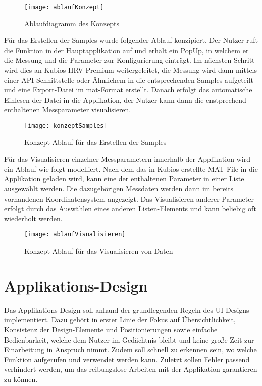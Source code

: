 \begin{figure}[H]
	\centering
	\texttt{[image: ablaufKonzept]}
	\caption{Ablaufdiagramm des Konzepts}
	\label{fig:ablaufKonzept}
\end{figure}

Für das Erstellen der Samples wurde folgender Ablauf konzipiert. Der Nutzer ruft die Funktion in der Hauptapplikation auf und erhält ein PopUp, in welchem er die Messung und die Parameter zur Konfigurierung einträgt. Im nächsten Schritt wird dies an Kubios HRV Premium weitergeleitet, die Messung  wird dann mittels einer API Schnittstelle oder Ähnlichem in die entsprechenden Samples aufgeteilt und eine Export-Datei im mat-Format erstellt. Danach erfolgt das automatische Einlesen der Datei in die Applikation, der Nutzer kann dann die enstprechend enthaltenen Messparameter visualisieren.

\begin{figure}[H]
	\centering
	\texttt{[image: konzeptSamples]}
	\caption{Konzept Ablauf für das Erstellen der Samples}
	\label{fig:konzeptSamples}
\end{figure}

Für das Visualisieren einzelner Messparametern innerhalb der Applikation wird ein Ablauf wie folgt modelliert. Nach dem das in Kubios erstellte MAT-File in die Applikation geladen wird, kann eine der enthaltenen Parameter in einer Liste ausgewählt werden. Die dazugehörigen Messdaten werden dann im bereits vorhandenen Koordinatensystem angezeigt. Das Visualisieren anderer Parameter erfolgt durch das Auswählen eines anderen Listen-Elements und kann beliebig oft wiederholt werden. 

\begin{figure}[H]
	\centering
	\texttt{[image: ablaufVisualisieren]}
	\caption{Konzept Ablauf für das Visualisieren von Daten}
	\label{fig:ablaufVisualisieren}
\end{figure}

\section{Applikations-Design}

Das Applikations-Design soll anhand der grundlegenden Regeln des UI Designs implementiert. Dazu gehört in erster Linie der Fokus auf Übersichtlichkeit, Konsistenz der Design-Elemente und Positionierungen sowie einfache Bedienbarkeit, welche dem Nutzer im Gedächtnis bleibt und keine große Zeit zur Einarbeitung in Anspruch nimmt. Zudem soll schnell zu erkennen sein, wo welche Funktion aufgerufen und verwendet werden kann. Zuletzt sollen Fehler passend verhindert werden, um das reibungslose Arbeiten mit der Applikation garantieren zu können.

